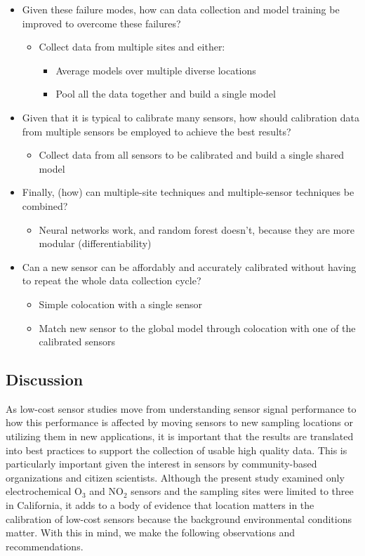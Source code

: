 \documentclass[journal abbreviation, manuscript]{copernicus}
\newcommand{\textus}[1]{$_{\text{#1}}$}
\begin{document}
\begin{itemize}
    \item Given these failure modes, how can data collection and model training be improved to overcome these failures?
      \begin{itemize}
          \item Collect data from multiple sites and either:
          \begin{itemize}
            \item Average models over multiple diverse locations 
            \item Pool all the data together and build a single model
          \end{itemize}
      \end{itemize}
    \item Given that it is typical to calibrate many sensors, how should calibration data from multiple sensors be employed to achieve the best results?
      \begin{itemize}
          \item Collect data from all sensors to be calibrated and build a single shared model
      \end{itemize}
    \item Finally, (how) can multiple-site techniques and multiple-sensor techniques be combined?
      \begin{itemize}
         \item Neural networks work, and random forest doesn’t, because they are more modular (differentiability)
      \end{itemize}
    \item Can a new sensor can be affordably and accurately calibrated without having to repeat the whole data collection cycle?
      \begin{itemize}
          \item Simple colocation with a single sensor
          \item Match new sensor to the global model through colocation with one of the calibrated sensors
      \end{itemize}
\end{itemize}
\fi

\subsection{Discussion}

As low-cost sensor studies move from understanding sensor signal performance to how this performance is affected by moving sensors to new sampling locations or utilizing them in new applications, it is important that the results are translated into best practices to support the collection of usable high quality data. This is particularly important given the interest in sensors by community-based organizations and citizen scientists. Although the present study examined only electrochemical O\textus{3} and NO\textus{2} sensors and the sampling sites were limited to three in California, it adds to a body of evidence that location matters in the calibration of low-cost sensors because the background environmental conditions matter.  With this in mind, we make the following observations and recommendations.
\end{document}
